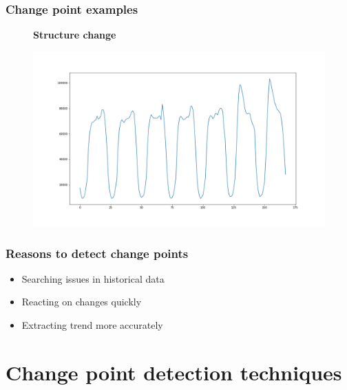 \documentclass[intlimits, 9pt, unicode]{beamer}
\begin{document}
\begin{frame}
\frametitle{Change point examples}
\begin{figure}
\textbf{Structure change}\par\medskip
\includegraphics[scale=0.30]{images/006_structure}
\end{figure}
\end{frame}

\begin{frame}
    \frametitle{Reasons to detect change points}

    \begin{itemize}
    	\item Searching issues in historical data 
	\item Reacting on changes quickly
	\item Extracting trend more accurately
    \end{itemize}
\end{frame}


\section{Change point detection techniques}
\end{document}

